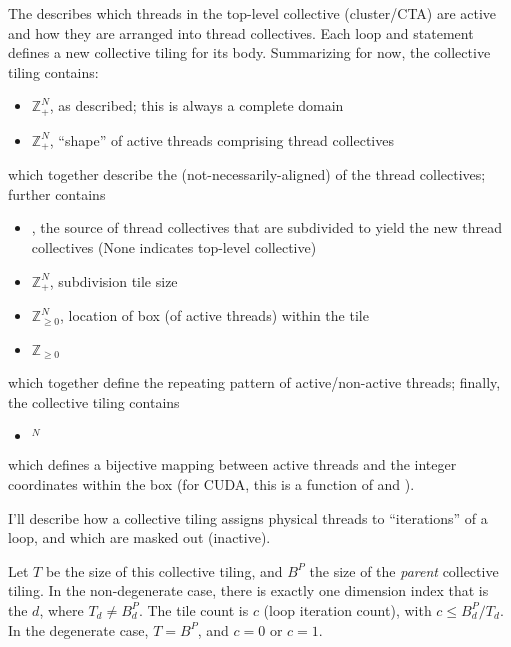\filbreak
{}

The  describes which threads in the top-level collective (cluster/CTA) are active and how they are arranged into thread collectives.
Each  loop and  statement defines a new collective tiling for its body.
Summarizing for now, the collective tiling contains:
\begin{itemize}
  \item {} $\mathbb{Z}^N_+$, as described; this is always a complete domain
  \item {} $\mathbb{Z}^N_+$, ``shape'' of active threads comprising thread collectives
\end{itemize}
\filbreak
which together describe the (not-necessarily-aligned)  of the thread collectives; further contains
\begin{itemize}
  \item {} , the source of thread collectives that are subdivided to yield the new thread collectives (None indicates top-level collective)
  \filbreak
  \item {} $\mathbb{Z}^N_+$, subdivision tile size
  \filbreak
  \item {} $\mathbb{Z}^N_{\ge 0}$, location of box (of active threads) within the tile
  \filbreak
  \item {} $\mathbb{Z}_{\ge 0}$
\end{itemize}
which together define the repeating pattern of active/non-active threads; finally, the collective tiling contains
\filbreak
\begin{itemize}
  \item {} $^N$
\end{itemize}
which defines a bijective mapping between active threads and the integer coordinates within the box (for CUDA, this is a function of  and ).

\filbreak
{}

I'll describe how a collective tiling assigns physical threads to ``iterations'' of a  loop, and which are masked out (inactive).

\filbreak
{} Let $T$ be the  size of this collective tiling, and $B^P$ the  size of the \textit{parent} collective tiling.
In the non-degenerate case, there is exactly one dimension index that is the  $d$, where $T_d \ne B^P_d$.
The tile count is $c$ (loop iteration count), with $c \le B^P_d / T_d$.
In the degenerate case, $T = B^P$, and $c = 0$ or $c = 1$.

